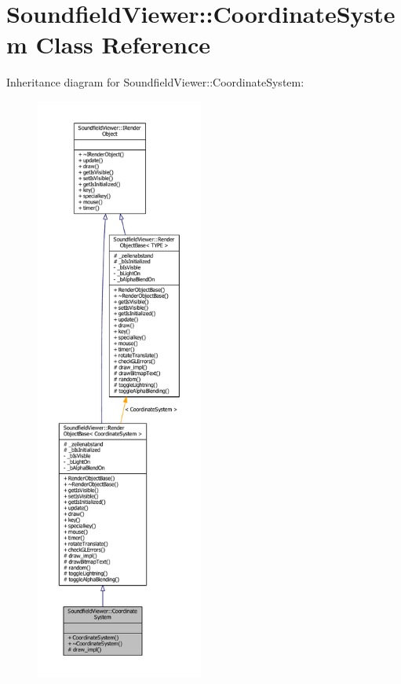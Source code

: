 \section{Soundfield\-Viewer\-:\-:Coordinate\-System Class Reference}
\label{classSoundfieldViewer_1_1CoordinateSystem}


Inheritance diagram for Soundfield\-Viewer\-:\-:Coordinate\-System\-:\nopagebreak
\begin{figure}[H]
\begin{center}
\leavevmode
\includegraphics[height=550pt]{d6/dab/classSoundfieldViewer_1_1CoordinateSystem__inherit__graph}
\end{center}
\end{figure}


